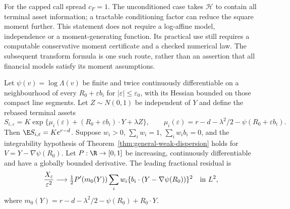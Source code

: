 For the capped call spread $c_F=1$. The unconditioned case takes
$\mathcal H$ to contain all terminal asset information; a tractable
conditioning factor can reduce the square moment further. This statement
does not require a log-affine model, independence or a moment-generating
function. Its practical use still requires a computable conservative
moment certificate and a checked numerical law. The subsequent transform
formula is one such route, rather than an assertion that all financial
models satisfy its moment assumptions.

\begin{proposition}
\label{prop:mgf-risk-neutral}
Let $\psi(v)=\log\Lambda(v)$ be finite and twice continuously differentiable
on a neighbourhood of every $R_0+\varepsilon b_i$ for
$|\varepsilon|\leq\varepsilon_0$, with its Hessian bounded on those
compact line segments. Let $Z\sim N(0,1)$ be independent of $Y$ and define
the rebased terminal assets
\begin{equation}
 S_{i,\varepsilon}=K\exp\{\mu_i(\varepsilon)
                  +(R_0+\varepsilon b_i)\cdot Y+\lambda Z\},\qquad
 \mu_i(\varepsilon)=r-d-\lambda^2/2-\psi(R_0+\varepsilon b_i).
\end{equation}
Then $\E S_{i,\varepsilon}=Ke^{r-d}$.
Suppose $w_i>0$, $\sum_iw_i=1$, $\sum_iw_i b_i=0$, and the
integrability hypothesis of
Theorem~\ref{thm:general-weak-dispersion} holds for
$V=Y-\nabla\psi(R_0)$. Let $P:\R\to[0,1]$ be increasing,
continuously differentiable and have a globally bounded derivative. The
leading fractional residual is
\begin{equation}
 \frac{X_\varepsilon}{\varepsilon^2}
 \longrightarrow
 \tfrac12P'(m_0(Y))\sum_iw_i
       \{b_i\cdot(Y-\nabla\psi(R_0))\}^2
 \quad\hbox{in }L^2,
\end{equation}
where $m_0(Y)=r-d-\lambda^2/2-\psi(R_0)+R_0\cdot Y$.
\end{proposition}

